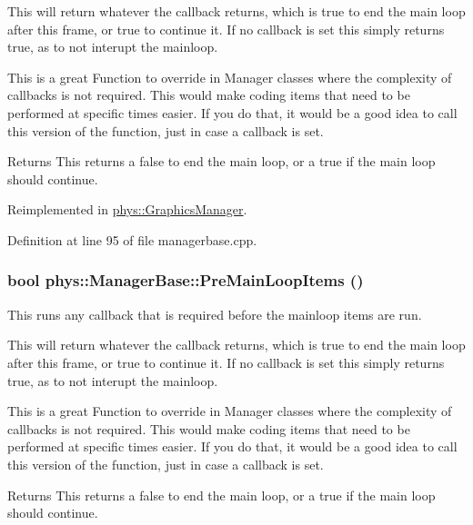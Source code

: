 This will return whatever the callback returns, which is true to end the main loop after this frame, or true to continue it. If no callback is set this simply returns true, as to not interupt the mainloop. \par
 This is a great Function to override in Manager classes where the complexity of callbacks is not required. This would make coding items that need to be performed at specific times easier. If you do that, it would be a good idea to call this version of the function, just in case a callback is set. \begin{DoxyReturn}{Returns}
This returns a false to end the main loop, or a true if the main loop should continue. 
\end{DoxyReturn}


Reimplemented in \hyperlink{classphys_1_1GraphicsManager_ae2330172be150cd4d12aa2ed62b0474c}{phys::GraphicsManager}.



Definition at line 95 of file managerbase.cpp.

\hypertarget{classphys_1_1ManagerBase_af6210834a8af592481cf6aefa9916d88}{
\subsubsection[{PreMainLoopItems}]{\setlength{\rightskip}{0pt plus 5cm}bool phys::ManagerBase::PreMainLoopItems ()}}
\label{d2/de3/classphys_1_1ManagerBase_af6210834a8af592481cf6aefa9916d88}


This runs any callback that is required before the mainloop items are run. 

This will return whatever the callback returns, which is true to end the main loop after this frame, or true to continue it. If no callback is set this simply returns true, as to not interupt the mainloop. \par
 This is a great Function to override in Manager classes where the complexity of callbacks is not required. This would make coding items that need to be performed at specific times easier. If you do that, it would be a good idea to call this version of the function, just in case a callback is set. \begin{DoxyReturn}{Returns}
This returns a false to end the main loop, or a true if the main loop should continue. 
\end{DoxyReturn}


